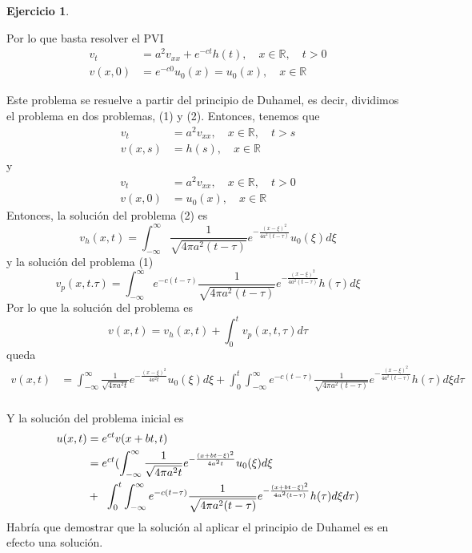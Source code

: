 \documentclass{article}
\theoremstyle{plain}
\theoremstyle{definition}
\newtheorem{ex}[proposición]{Ejercicio}
\begin{document}
\begin{ex}
\begin{enumerate}
            Por lo que basta resolver el PVI
            \begin{align*}
                v_t &= a^2 v_{xx} + e^{-ct} h(t), \quad x \in \mathbb{R}, \quad t > 0\\
                v(x, 0) &= e^{-c0} u_0(x) = u_0(x), \quad x \in \mathbb{R}
            \end{align*}
            
            Este problema se resuelve a partir del principio de Duhamel, es decir, dividimos el problema en dos problemas,  (1) y (2). Entonces, tenemos que
            \begin{align*}
                v_t &= a^2 v_{xx}, \quad x \in \mathbb{R}, \quad t > s\\
                v(x, s) &= h(s), \quad x \in \mathbb{R}
            \end{align*}
            y
            \begin{align*}
                v_t &= a^2 v_{xx}, \quad x \in \mathbb{R}, \quad t > 0\\
                v(x, 0) &= u_0(x), \quad x \in \mathbb{R}
            \end{align*}
            Entonces, la solución del problema (2) es
            \[
                v_{h}(x, t) = \int_{-\infty}^{\infty} \frac{1}{\sqrt{4 \pi a^2 (t - \tau)}} e^{-\frac{(x - \xi)^2}{4a^2 (t - \tau)}} u_{0}(\xi) d\xi
            \]
            y la solución del problema (1)
            \[
                v_{p}(x, t. \tau) = \int_{-\infty}^{\infty} e^{-c(t - \tau)} \frac{1}{\sqrt{4 \pi a^2 (t - \tau)}} e^{-\frac{(x - \xi)^2}{4a^2 (t - \tau)}} h(\tau) d\xi
            \]
            Por lo que la solución del problema es
            \[
                v(x, t) = v_{h}(x, t) + \int_0^t v_{p}(x, t, \tau) d\tau
            \]
            queda
            \begin{align*}
                v(x, t) &= \int_{-\infty}^{\infty} \frac{1}{\sqrt{4 \pi a^2 t}} e^{-\frac{(x - \xi)^2}{4a^2 t}} u_0(\xi) d\xi + \int_0^t \int_{-\infty}^{\infty} e^{-c(t - \tau)} \frac{1}{\sqrt{4 \pi a^2 (t - \tau)}} e^{-\frac{(x - \xi)^2}{4a^2 (t - \tau)}} h(\tau) d\xi d\tau \\
            \end{align*}

            Y la solución del problema inicial es
            \begin{align*}
                u(x,t) &= e^{ct} v(x + bt,t)\\
                &= e^{ct} ( \int_{-\infty}^{\infty} \frac{1}{\sqrt{4 \pi a^2 t}} e^{-\frac{(x + bt - \xi)^2}{4a^2 t}} u_0(\xi) d\xi\\
                & +\hspace{2mm} \int_0^t \int_{-\infty}^{\infty} e^{-c(t - \tau)} \frac{1}{\sqrt{4 \pi a^2 (t - \tau)}} e^{-\frac{(x + bt - \xi)^2}{4a^2 (t - \tau)}} h(\tau) d\xi d\tau)
            \end{align*}
            Habría que demostrar que la solución al aplicar el principio de Duhamel es en efecto una solución.


\end{enumerate}
\end{ex}
\end{document}
